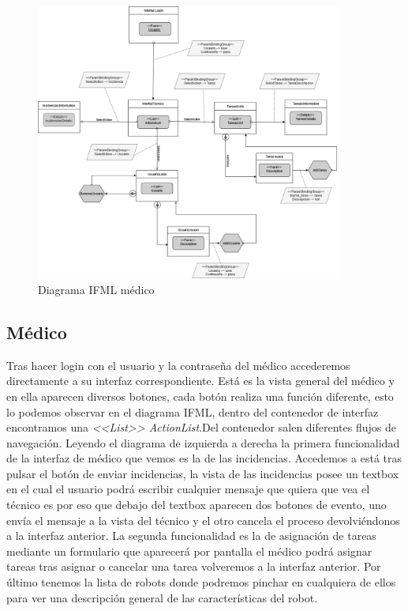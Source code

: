 \documentclass{scrreprt}
\begin{document}
\begin{figure}[H]
	\centering
	\includegraphics[width=0.9\textwidth]{images/IMFL_tecnico.drawio.png}
	\caption{Diagrama IFML médico}
	\label{fig:example1}
\end{figure}

\newpage

\subsection{Médico} 

Tras hacer login con el usuario y la contraseña del médico accederemos directamente a su interfaz correspondiente. Está es la vista general del médico y en ella aparecen diversos botones, cada botón realiza una función diferente, esto lo podemos observar en el diagrama IFML, dentro del contenedor de interfaz encontramos una \textit{<<List>> ActionList}.Del contenedor salen diferentes flujos de navegación. Leyendo el diagrama de izquierda a derecha la primera funcionalidad de la interfaz de médico que vemos es la de las incidencias. Accedemos a está tras pulsar el botón de enviar incidencias, la vista de las incidencias posee un textbox en el cual el usuario podrá escribir cualquier mensaje que quiera que vea el técnico es por eso que debajo del textbox aparecen dos botones de evento, uno envía el mensaje a la vista del técnico y el otro cancela el proceso devolviéndonos a la interfaz anterior. La segunda funcionalidad es la de asignación de tareas mediante un formulario que aparecerá por pantalla el médico podrá asignar tareas tras asignar o cancelar una tarea volveremos a la interfaz anterior. Por último tenemos la lista de robots donde podremos pinchar en cualquiera de ellos para ver una descripción general de las características del robot.\\
\\
\end{document}
